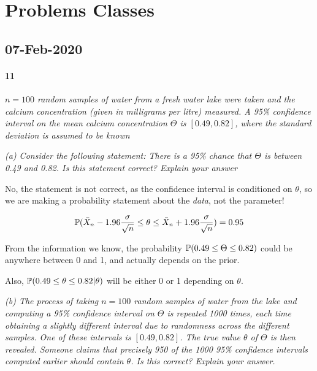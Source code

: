 \newpage
\section*{Problems Classes}
    \subsection*{07-Feb-2020}
        \paragraph{11}
        \textit{$n = 100$ random samples of water from a fresh water lake
        were taken and the calcium concentration (given in milligrams per
        litre) measured. A 95\% confidence interval on the mean calcium
        concentration $\Theta$ is $[0.49, 0.82]$, where the standard
        deviation is assumed to be known}

        \textit{(a) Consider the following statement: There is a 95\% chance
        that $\Theta$ is between 0.49 and 0.82. Is this statement correct?
        Explain your answer}

            No, the statement is not correct, as the confidence interval is
            conditioned on $\theta$, so we are making a probability
            statement about the \textit{data}, not the parameter!

            \[
                \mathbb{P}(\bar X_n - 1.96 \frac{\sigma}{\sqrt{n}} \leq \theta
                \leq \bar X_n + 1.96 \frac{\sigma}{\sqrt{n}}) = 0.95
            \]

            From the information we know, the probability $\mathbb{P}(0.49 \leq
            \Theta \leq 0.82)$ could be anywhere between 0 and 1, and
            actually depends on the prior.

            Also, $\mathbb{P}(0.49 \leq \theta \leq 0.82 | \theta)$ will be
            either 0 or 1 depending on $\theta$.

        \textit{(b) The process of taking $n = 100$ random samples of water
        from the lake and computing a 95\% confidence interval on $\Theta$
        is repeated 1000 times, each time obtaining a slightly different
        interval due to randomness across the different samples. One of
        these intervals is $[0.49, 0.82]$. The true value $\theta$ of
        $\Theta$ is then revealed. Someone claims that precisely 950 of the
        1000 95\% confidence intervals computed earlier should contain
        $\theta$. Is this correct? Explain your answer.}

